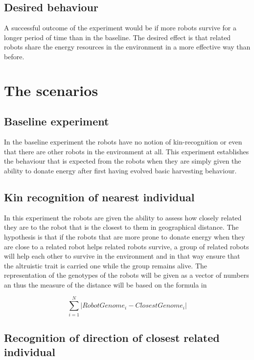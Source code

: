 \documentclass[a4paper]{book}
\begin{document}
\subsection{Desired behaviour}

A successful outcome of the experiment would be if more robots survive for a longer period of time than in the baseline. 
The desired effect is that related robots share the energy resources in the environment in a more effective way than before.  

\section{The scenarios}



\subsection{Baseline experiment}

In the baseline experiment the robots have no notion of kin-recognition or even that there are other robots in the environment at all. 
This experiment establishes the behaviour that is expected from the robots when they are simply given the ability to donate energy after first having evolved basic harvesting behaviour.

\subsection{Kin recognition of nearest individual}

In this experiment the robots are given the ability to assess how closely related they are to the robot that is the closest to them in geographical distance. 
The hypothesis is that if the robots that are more prone to donate energy when they are close to a related robot helps related robots survive, a group of related robots will help each other to survive in the environment and in that way ensure that the altruistic trait is carried one while the group remains alive. 
The representation of the genotypes of the robots will be given as a vector of numbers an thus the measure of the distance will be based on the formula in



$$ \sum_{i=1}^{N} | RobotGenome_i - ClosestGenome_i |$$



\subsection{Recognition of direction of closest related individual}
\end{document}
